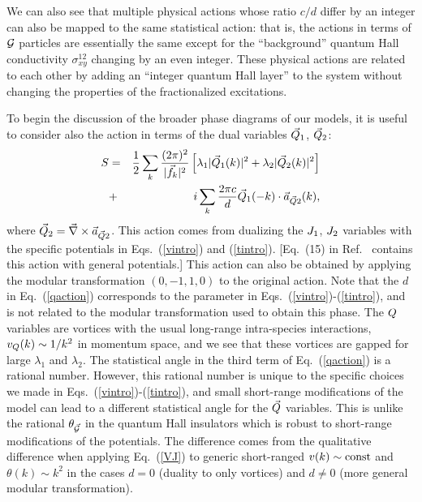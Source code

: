 We can also see that multiple physical actions whose ratio $c/d$ differ by an integer can also be mapped to the same statistical action: that is, the actions in terms of $\cal{G}$ particles are essentially the same except for the ``background'' quantum Hall conductivity $\sigma^{12}_{xy}$ changing by an even integer. These physical actions are related to each other by adding an ``integer quantum Hall layer'' to the system without changing the properties of the fractionalized excitations. 

To begin the discussion of the broader phase diagrams of our models, it is useful to consider also the action in terms of the dual variables $\vec{Q}_1$, $\vec{Q}_2$:
\begin{eqnarray}
S &=& \frac{1}{2}\sum_k \frac{(2\pi)^2 }{|\vec{f}_k|^2} \left[\lambda_1|\vec{Q}_1(k)|^2+\lambda_2|\vec{Q}_2(k)|^2\right]\nonumber\\
&+& i\sum_k \frac{2\pi c}{d} \vec{Q}_1(-k)\cdot \vec{a}_{\vec{Q}2}(k),
\label{qaction}
\end{eqnarray}
where $\vec{Q}_2=\vec{\nabla}\times\vec{a}_{\vec{Q}2}$. This action comes from dualizing the $J_1$, $J_2$ variables with the specific potentials in Eqs.~(\ref{vintro}) and (\ref{tintro}). [Eq.~(15) in Ref.~\cite{short_range3} contains this action with general potentials.] This action can also be obtained by applying the modular transformation $(0, -1, 1, 0)$ to the original action. Note that the $d$ in Eq.~(\ref{qaction}) corresponds to the parameter in Eqs.~(\ref{vintro})-(\ref{tintro}), and is not related to the modular transformation used to obtain this phase.  The $Q$ variables are vortices with the usual long-range intra-species interactions, $v_{Q}(k) \sim 1/k^2$ in momentum space, and we see that these vortices are gapped for large $\lambda_1$ and $\lambda_2$.  The statistical angle in the third term of Eq.~(\ref{qaction}) is a rational number.  However, this rational number is unique to the specific choices we made in Eqs.~(\ref{vintro})-(\ref{tintro}), and small short-range modifications of the model can lead to a different statistical angle for the $\vec{Q}$ variables.  This is unlike the rational $\theta_{\vec{\mathcal{G}}}$ in the quantum Hall insulators which is robust to short-range modifications of the potentials.  The difference comes from the qualitative difference when applying Eq.~(\ref{VJ}) to generic short-ranged $v(k) \sim {\rm const}$ and $\theta(k) \sim k^2$ in the cases $d=0$ (duality to only vortices) and $d\neq 0$ (more general modular transformation).

